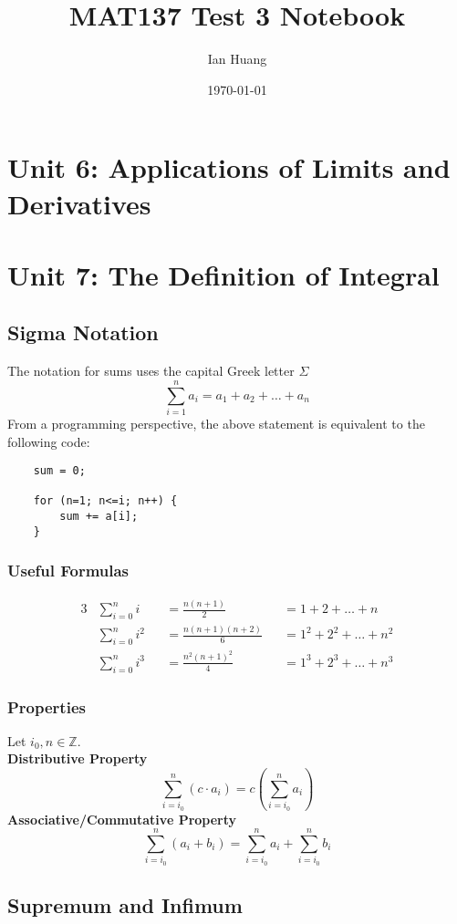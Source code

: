 \documentclass[11pt]{article}
\title{MAT137 Test 3 Notebook}
\author{Ian Huang}
\date{\today}
\def\Z{{\mathbb Z}}
\newcommand{\emptyline}[0]{\\\hfill$~$\\}
\begin{document}
\maketitle
\tableofcontents
\newpage
\section{Unit 6: Applications of Limits and Derivatives}
\section{Unit 7: The Definition of Integral}
\subsection{Sigma Notation}
The notation for sums uses the capital Greek letter $\Sigma$
$$
    \sum_{i=1}^n a_i=a_1+a_2+\dots+a_n
$$
From a programming perspective, the above statement is equivalent to the following code:
\begin{verbatim}
    sum = 0;
    
    for (n=1; n<=i; n++) {
        sum += a[i];
    }
\end{verbatim}
\subsubsection{Useful Formulas}

\begin{alignat*}{3}
     & \sum_{i=0}^n i   &  & =\frac{n(n+1)}{2}      &  & =1+2+\dots+n       \\
     & \sum_{i=0}^n i^2 &  & =\frac{n(n+1)(n+2)}{6} &  & =1^2+2^2+\dots+n^2 \\
     & \sum_{i=0}^n i^3 &  & =\frac{n^2(n+1)^2}{4}  &  & =1^3+2^3+\dots+n^3
\end{alignat*}
\subsubsection{Properties}
Let $i_0,n\in\Z$. \emptyline
\textbf{Distributive Property}
$$
    \sum_{i=i_0}^n(c\cdot a_i)=c\left(\sum_{i=i_0}^n a_i\right)
$$
\textbf{Associative/Commutative Property}
$$
    \sum_{i=i_0}^n(a_i+b_i)=\sum_{i=i_0}^na_i+\sum_{i=i_0}^nb_i
$$
\subsection{Supremum and Infimum}
\end{document}
